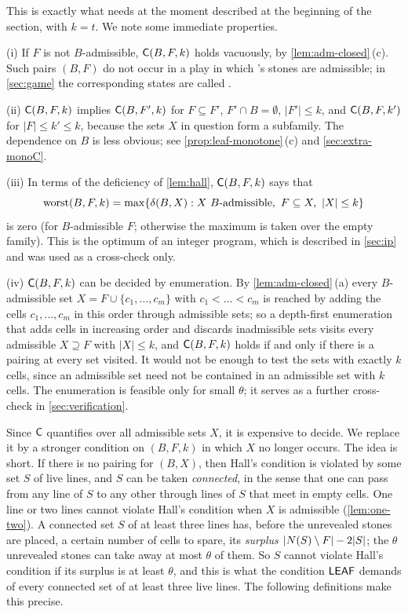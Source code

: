 This is exactly what \Breaker{} needs at the moment described at the beginning of the section, with
$k=t$. We note some immediate properties.

\begin{remark}\label{rem:C}
(i) If $F$ is not $B$-admissible, $\mathsf{C}(B,F,k)$ holds vacuously, by \cref{lem:adm-closed}\,(c). Such pairs
$(B,F)$ do not occur in a play in which \Maker's stones are admissible; in \cref{sec:game} the
corresponding states are called \VOID.

(ii) $\mathsf{C}(B,F,k)$ implies $\mathsf{C}(B,F',k)$ for $F\subseteq F'$, $F'\cap B=\emptyset$, $|F'|\le k$, and
$\mathsf{C}(B,F,k')$ for $|F|\le k'\le k$, because the sets $X$ in question form a subfamily. The dependence on $B$ is less
obvious; see \cref{prop:leaf-monotone}\,(c) and \cref{sec:extra-monoC}.

(iii) In terms of the deficiency of \cref{lem:hall}, $\mathsf{C}(B,F,k)$ says that
\[
  \worst(B,F,k)=\max\{\delta(B,X) : X\ B\text{-admissible},\ F\subseteq X,\ |X|\le k\}
\]
is zero (for $B$-admissible $F$; otherwise the maximum is taken over the empty family). This is the
optimum of an integer program, which is described in \cref{sec:ip} and was used as a cross-check only.

(iv) $\mathsf{C}(B,F,k)$ can be decided by enumeration. By \cref{lem:adm-closed}\,(a) every $B$-admissible set
$X=F\cup\{c_1,\dots,c_m\}$ with $c_1<\dots<c_m$ is reached by adding the cells $c_1,\dots,c_m$ in this
order through admissible sets; so a depth-first enumeration that adds cells in increasing order and
discards inadmissible sets visits every admissible $X\supseteq F$ with $|X|\le k$, and $\mathsf{C}(B,F,k)$ holds if
and only if there is a pairing at every set visited. It would not be enough to test the sets with
exactly $k$ cells, since an admissible set need not be contained in an admissible set with $k$ cells. The
enumeration is feasible only for small $\theta$; it serves as a further cross-check in
\cref{sec:verification}.
\end{remark}

Since $\mathsf{C}$ quantifies over all admissible sets $X$, it is expensive to decide. We replace it by a
stronger condition on $(B,F,k)$ in which $X$ no longer occurs. The idea is short. If there is no pairing
for $(B,X)$, then Hall's condition is violated by some set $S$ of live lines, and $S$ can be taken
\emph{connected}, in the sense that one can pass from any line of $S$ to any other through lines of $S$
that meet in empty cells. One line or two lines cannot violate Hall's condition when $X$ is admissible
(\cref{lem:one-two}). A connected set $S$ of at least three lines has, before the unrevealed stones are
placed, a certain number of cells to spare, its \emph{surplus} $|N(S)\setminus F|-2|S|$; the $\theta$
unrevealed stones can take away at most $\theta$ of them. So $S$ cannot violate Hall's condition if its
surplus is at least $\theta$, and this is what the condition $\mathsf{LEAF}$ demands of every connected set of at
least three live lines. The following definitions make this precise.

